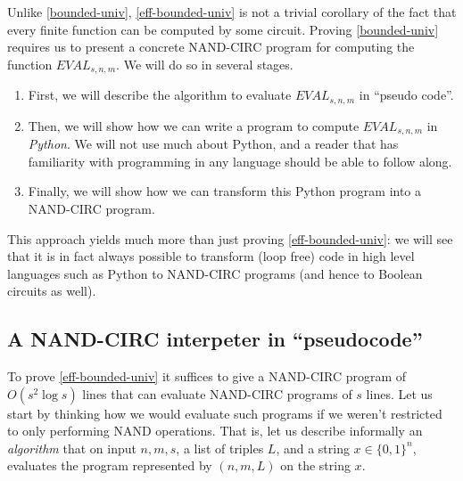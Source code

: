 
Unlike \cref{bounded-univ}, \cref{eff-bounded-univ} is not a trivial
corollary of the fact that every finite function can be computed by some
circuit. Proving \cref{bounded-univ} requires us to present a concrete
NAND-CIRC program for computing the function
\(\ensuremath{\mathit{EVAL}}_{s,n,m}\). We will do so in several stages.

\begin{enumerate}
\def\labelenumi{\arabic{enumi}.}
\item
  First, we will describe the algorithm to evaluate
  \(\ensuremath{\mathit{EVAL}}_{s,n,m}\) in ``pseudo code''.
\item
  Then, we will show how we can write a program to compute
  \(\ensuremath{\mathit{EVAL}}_{s,n,m}\) in \emph{Python}. We will not
  use much about Python, and a reader that has familiarity with
  programming in any language should be able to follow along.
\item
  Finally, we will show how we can transform this Python program into a
  NAND-CIRC program.
\end{enumerate}

This approach yields much more than just proving
\cref{eff-bounded-univ}: we will see that it is in fact always possible
to transform (loop free) code in high level languages such as Python to
NAND-CIRC programs (and hence to Boolean circuits as well).

\subsection{A NAND-CIRC interpeter in
``pseudocode''}\label{A-NAND-CIRC-interpeter-in}

To prove \cref{eff-bounded-univ} it suffices to give a NAND-CIRC program
of \(O(s^2 \log s)\) lines that can evaluate NAND-CIRC programs of \(s\)
lines. Let us start by thinking how we would evaluate such programs if
we weren't restricted to only performing NAND operations. That is, let
us describe informally an \emph{algorithm} that on input \(n,m,s\), a
list of triples \(L\), and a string \(x\in \{0,1\}^n\), evaluates the
program represented by \((n,m,L)\) on the string \(x\).

